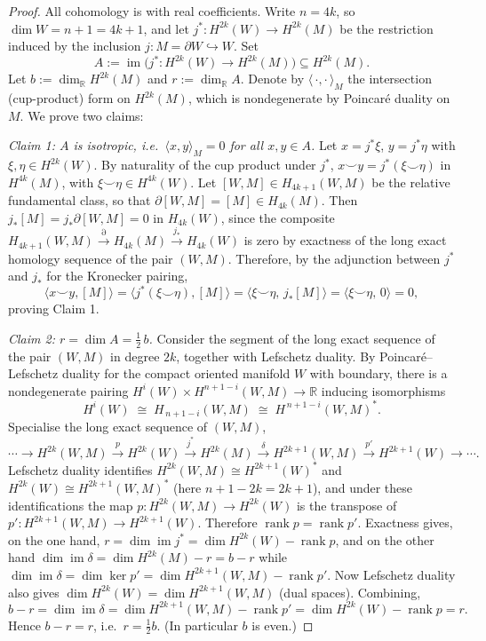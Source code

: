 \documentclass[12pt]{article}
\theoremstyle{definition}
\begin{document}
\begin{proof}
All cohomology is with real coefficients.  Write $n=4k$, so $\dim W=n+1=4k+1$, and let
$j^\ast\colon H^{2k}(W)\to H^{2k}(M)$ be the restriction induced by the inclusion
$j\colon M=\partial W\hookrightarrow W$.  Set
\[
A:=\operatorname{im}\big(j^\ast\colon H^{2k}(W)\to H^{2k}(M)\big)\subseteq H^{2k}(M).
\]
Let $b:=\dim_{\mathbb R} H^{2k}(M)$ and $r:=\dim_{\mathbb R}A$.  Denote by
$\langle\,\cdot,\cdot\,\rangle_M$ the intersection (cup-product) form on $H^{2k}(M)$,
which is nondegenerate by Poincar\'e duality on $M$.  We prove two claims:
\smallskip

\noindent\emph{Claim 1: $A$ is isotropic, i.e.\ $\langle x,y\rangle_M=0$ for all
$x,y\in A$.}\;
Let $x=j^\ast\xi$, $y=j^\ast\eta$ with $\xi,\eta\in H^{2k}(W)$.  By naturality of the cup
product under $j^\ast$, $x\smile y=j^\ast(\xi\smile\eta)$ in $H^{4k}(M)$, with
$\xi\smile\eta\in H^{4k}(W)$.  Let $[W,M]\in H_{4k+1}(W,M)$ be the relative fundamental
class, so that $\partial[W,M]=[M]\in H_{4k}(M)$.  Then $j_\ast[M]=j_\ast\partial[W,M]=0$
in $H_{4k}(W)$, since the composite $H_{4k+1}(W,M)\xrightarrow{\partial}H_{4k}(M)
\xrightarrow{j_\ast}H_{4k}(W)$ is zero by exactness of the long exact homology sequence of
the pair $(W,M)$.  Therefore, by the adjunction between $j^\ast$ and $j_\ast$ for the
Kronecker pairing,
\[
\big\langle x\smile y,[M]\big\rangle
=\big\langle j^\ast(\xi\smile\eta),[M]\big\rangle
=\big\langle \xi\smile\eta,\,j_\ast[M]\big\rangle
=\big\langle \xi\smile\eta,\,0\big\rangle=0 ,
\]
proving Claim 1.
\smallskip

\noindent\emph{Claim 2: $r=\dim A=\tfrac12\,b$.}\;
Consider the segment of the long exact sequence of the pair $(W,M)$ in degree $2k$,
together with Lefschetz duality.  By Poincar\'e--Lefschetz duality for the compact
oriented manifold $W$ with boundary, there is a nondegenerate pairing
$H^{i}(W)\times H^{n+1-i}(W,M)\to\mathbb R$ inducing isomorphisms
\[
H^{i}(W)\;\cong\;H_{\,n+1-i}(W,M)\;\cong\;H^{\,n+1-i}(W,M)^\ast .
\]
Specialise the long exact sequence of $(W,M)$,
\[
\cdots\to H^{2k}(W,M)\xrightarrow{\;p\;}H^{2k}(W)\xrightarrow{\;j^\ast\;}
H^{2k}(M)\xrightarrow{\;\delta\;}H^{2k+1}(W,M)\xrightarrow{\;p'\;}H^{2k+1}(W)\to\cdots .
\]
Lefschetz duality identifies $H^{2k}(W,M)\cong H^{2k+1}(W)^\ast$ and
$H^{2k}(W)\cong H^{2k+1}(W,M)^\ast$ (here $n+1-2k=2k+1$), and under these identifications
the map $p\colon H^{2k}(W,M)\to H^{2k}(W)$ is the transpose of
$p'\colon H^{2k+1}(W,M)\to H^{2k+1}(W)$.  Therefore
$\operatorname{rank}p=\operatorname{rank}p'$.  Exactness gives, on the one hand,
$r=\dim\operatorname{im}j^\ast=\dim H^{2k}(W)-\operatorname{rank}p$, and on the other hand
$\dim\operatorname{im}\delta=\dim H^{2k}(M)-r=b-r$ while
$\dim\operatorname{im}\delta=\dim\ker p'=\dim H^{2k+1}(W,M)-\operatorname{rank}p'$.  Now
Lefschetz duality also gives $\dim H^{2k}(W)=\dim H^{2k+1}(W,M)$ (dual spaces).  Combining,
\[
b-r=\dim\operatorname{im}\delta=\dim H^{2k+1}(W,M)-\operatorname{rank}p'
=\dim H^{2k}(W)-\operatorname{rank}p=r .
\]
Hence $b-r=r$, i.e.\ $r=\tfrac12 b$.  (In particular $b$ is even.)
\smallskip


\end{proof}
\end{document}
